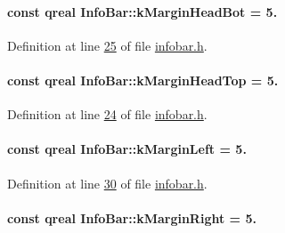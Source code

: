 \paragraph[{k\+Margin\+Head\+Bot}]{\setlength{\rightskip}{0pt plus 5cm}const qreal Info\+Bar\+::k\+Margin\+Head\+Bot = 5.\hspace{0.3cm}{\ttfamily [static]}}\label{class_info_bar_a0cfbafbc9f780fc1366157b9c8379463}


Definition at line \hyperlink{infobar_8h_source_l00025}{25} of file \hyperlink{infobar_8h_source}{infobar.\+h}.

\hypertarget{class_info_bar_ae24b5cac460550a4c86203a3dbd96ba9}{}
\paragraph[{k\+Margin\+Head\+Top}]{\setlength{\rightskip}{0pt plus 5cm}const qreal Info\+Bar\+::k\+Margin\+Head\+Top = 5.\hspace{0.3cm}{\ttfamily [static]}}\label{class_info_bar_ae24b5cac460550a4c86203a3dbd96ba9}


Definition at line \hyperlink{infobar_8h_source_l00024}{24} of file \hyperlink{infobar_8h_source}{infobar.\+h}.

\hypertarget{class_info_bar_a3c7688259f189cb28c2682f50a59335a}{}
\paragraph[{k\+Margin\+Left}]{\setlength{\rightskip}{0pt plus 5cm}const qreal Info\+Bar\+::k\+Margin\+Left = 5.\hspace{0.3cm}{\ttfamily [static]}}\label{class_info_bar_a3c7688259f189cb28c2682f50a59335a}


Definition at line \hyperlink{infobar_8h_source_l00030}{30} of file \hyperlink{infobar_8h_source}{infobar.\+h}.

\hypertarget{class_info_bar_a2ce020e319adf3de887bf17e803887a3}{}
\paragraph[{k\+Margin\+Right}]{\setlength{\rightskip}{0pt plus 5cm}const qreal Info\+Bar\+::k\+Margin\+Right = 5.\hspace{0.3cm}{\ttfamily [static]}}\label{class_info_bar_a2ce020e319adf3de887bf17e803887a3}


